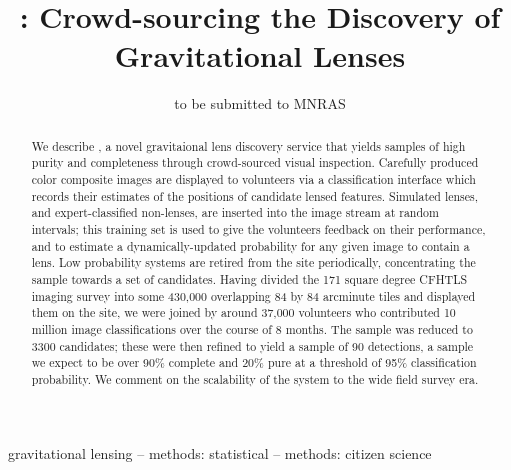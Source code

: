 \documentclass[useAMS,usenatbib,a4paper]{mn2e}
\title[\SW]
{\SW: Crowd-sourcing the Discovery of Gravitational Lenses}
\author[Marshall et al.]{%
  
}
\begin{document}
\date{to be submitted to MNRAS}
\pagerange{\pageref{firstpage}--\pageref{lastpage}}

\maketitle

\label{firstpage}


\begin{abstract}

We describe \SW, a novel gravitaional lens discovery service that yields samples
of high purity and completeness through crowd-sourced visual inspection.
Carefully produced color composite images are displayed to volunteers via a
classification interface which records their estimates of the positions of
candidate lensed features. Simulated lenses, and expert-classified non-lenses,
are inserted into the image stream at random intervals; this training set is
used to give the volunteers feedback on their performance, and to estimate a
dynamically-updated probability for any given image to contain a lens. Low
probability systems are retired from the site periodically, concentrating the
sample towards a set of candidates. Having divided the 171 square degree CFHTLS
imaging survey into some 430,000 overlapping 84 by 84 arcminute tiles and
displayed them on the site, we were joined by around 37,000 volunteers who
contributed 10 million image classifications over the course of 8 months. The
sample was reduced to 3300 \StageOne candidates; these were then refined to
yield a sample of 90 \StageTwo detections, a sample we expect to be over 90\%
complete and 20\% pure at a threshold of 95\% classification probability. We
comment on the scalability of the \SW system to the wide field survey era.

\end{abstract}


\begin{keywords}
  gravitational lensing   --
  methods: statistical    --
  methods: citizen science
\end{keywords}

\setcounter{footnote}{1}

\end{document}
